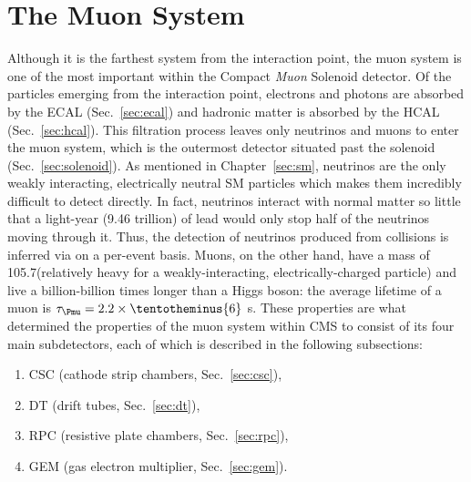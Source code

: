 \section{The Muon System}
\label{sec:muon_sys}
Although it is the farthest system from the interaction point, the muon system is one of the most important within the Compact \emph{Muon} Solenoid detector.
Of the particles emerging from the interaction point, electrons and photons are absorbed by the ECAL (Sec.~\ref{sec:ecal}) and hadronic matter is absorbed by the HCAL (Sec.~\ref{sec:hcal}).
This filtration process leaves only neutrinos and muons to enter the muon system, which is the outermost detector situated past the solenoid (Sec.~\ref{sec:solenoid}).
As mentioned in Chapter~\ref{sec:sm}, neutrinos are the only weakly interacting, electrically neutral SM particles which makes them incredibly difficult to detect directly.
In fact, neutrinos interact with normal matter so little that a light-year (9.46 trillion\Km) of lead would only stop half of the neutrinos moving through it.
Thus, the detection of neutrinos produced from \pp collisions is inferred via \MET on a per-event basis.
Muons, on the other hand, have a mass of 105.7\MeV (relatively heavy for a weakly-interacting, electrically-charged particle) and live a billion-billion times longer than a Higgs boson: the average lifetime of a muon is $\tau_{\Pmu} = 2.2 \times \tentotheminus{6}$ s.
These properties are what determined the properties of the muon system within CMS to consist of its four main subdetectors, each of which is described in the following subsections:
\begin{enumerate}
    \item CSC (cathode strip chambers, Sec.~\ref{sec:csc}),
    \item DT (drift tubes, Sec.~\ref{sec:dt}),
    \item RPC (resistive plate chambers, Sec.~\ref{sec:rpc}),
    \item GEM (gas electron multiplier, Sec.~\ref{sec:gem}).
\end{enumerate}

